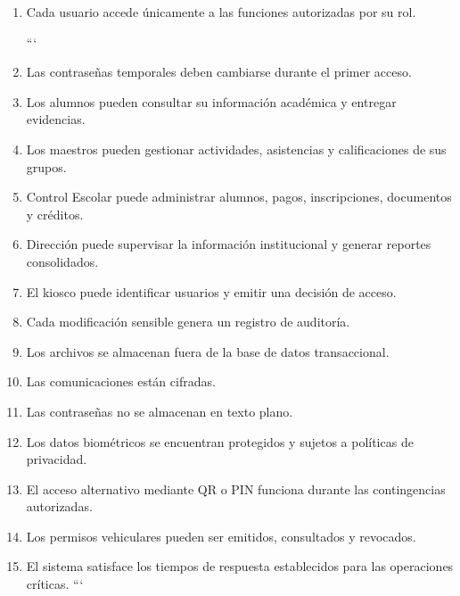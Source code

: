\documentclass[12pt,a4paper]{article}
\begin{document}
\begin{enumerate}[leftmargin=*]
\item Cada usuario accede únicamente a las funciones autorizadas por su rol.

```
\item Las contraseñas temporales deben cambiarse durante el primer acceso.

\item Los alumnos pueden consultar su información académica y entregar
evidencias.

\item Los maestros pueden gestionar actividades, asistencias y calificaciones
de sus grupos.

\item Control Escolar puede administrar alumnos, pagos, inscripciones,
documentos y créditos.

\item Dirección puede supervisar la información institucional y generar
reportes consolidados.

\item El kiosco puede identificar usuarios y emitir una decisión de acceso.

\item Cada modificación sensible genera un registro de auditoría.

\item Los archivos se almacenan fuera de la base de datos transaccional.

\item Las comunicaciones están cifradas.

\item Las contraseñas no se almacenan en texto plano.

\item Los datos biométricos se encuentran protegidos y sujetos a políticas de
privacidad.

\item El acceso alternativo mediante QR o PIN funciona durante las
contingencias autorizadas.

\item Los permisos vehiculares pueden ser emitidos, consultados y revocados.

\item El sistema satisface los tiempos de respuesta establecidos para las
operaciones críticas.
```

\end{enumerate}

\end{document}

